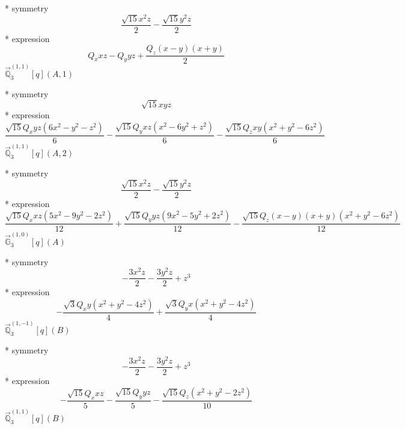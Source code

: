 \documentclass[fleqn,8pt]{jsarticle}
\begin{document}
\noindent\quad ** symmetry
\begin{dmath*}
\frac{\sqrt{15} x^{2} z}{2} - \frac{\sqrt{15} y^{2} z}{2}
\end{dmath*}
\noindent\quad ** expression
\begin{dmath*}
Q_{x} x z - Q_{y} y z + \frac{Q_{z} \left(x - y\right) \left(x + y\right)}{2}
\end{dmath*}
\noindent\quad $\vec{\mathbb{Q}}_{3}^{(1,1)}[q](A,1)$

\noindent\quad ** symmetry
\begin{dmath*}
\sqrt{15} x y z
\end{dmath*}
\noindent\quad ** expression
\begin{dmath*}
\frac{\sqrt{15} Q_{x} y z \left(6 x^{2} - y^{2} - z^{2}\right)}{6} - \frac{\sqrt{15} Q_{y} x z \left(x^{2} - 6 y^{2} + z^{2}\right)}{6} - \frac{\sqrt{15} Q_{z} x y \left(x^{2} + y^{2} - 6 z^{2}\right)}{6}
\end{dmath*}
\noindent\quad $\vec{\mathbb{Q}}_{3}^{(1,1)}[q](A,2)$

\noindent\quad ** symmetry
\begin{dmath*}
\frac{\sqrt{15} x^{2} z}{2} - \frac{\sqrt{15} y^{2} z}{2}
\end{dmath*}
\noindent\quad ** expression
\begin{dmath*}
\frac{\sqrt{15} Q_{x} x z \left(5 x^{2} - 9 y^{2} - 2 z^{2}\right)}{12} + \frac{\sqrt{15} Q_{y} y z \left(9 x^{2} - 5 y^{2} + 2 z^{2}\right)}{12} - \frac{\sqrt{15} Q_{z} \left(x - y\right) \left(x + y\right) \left(x^{2} + y^{2} - 6 z^{2}\right)}{12}
\end{dmath*}
\noindent\quad $\vec{\mathbb{G}}_{3}^{(1,0)}[q](A)$

\noindent\quad ** symmetry
\begin{dmath*}
- \frac{3 x^{2} z}{2} - \frac{3 y^{2} z}{2} + z^{3}
\end{dmath*}
\noindent\quad ** expression
\begin{dmath*}
- \frac{\sqrt{3} Q_{x} y \left(x^{2} + y^{2} - 4 z^{2}\right)}{4} + \frac{\sqrt{3} Q_{y} x \left(x^{2} + y^{2} - 4 z^{2}\right)}{4}
\end{dmath*}
\noindent\quad $\vec{\mathbb{Q}}_{3}^{(1,-1)}[q](B)$

\noindent\quad ** symmetry
\begin{dmath*}
- \frac{3 x^{2} z}{2} - \frac{3 y^{2} z}{2} + z^{3}
\end{dmath*}
\noindent\quad ** expression
\begin{dmath*}
- \frac{\sqrt{15} Q_{x} x z}{5} - \frac{\sqrt{15} Q_{y} y z}{5} - \frac{\sqrt{15} Q_{z} \left(x^{2} + y^{2} - 2 z^{2}\right)}{10}
\end{dmath*}
\noindent\quad $\vec{\mathbb{Q}}_{3}^{(1,1)}[q](B)$
\end{document}
